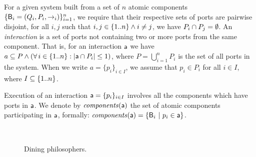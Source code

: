 \bd[Interaction] For a given system built from a set of $n$ atomic components 
$\{\mathsf{B}_i = (Q_i, P_i, \stackrel{}{\rightarrow}_i)\}_{i=1}^n$, we require that their respective sets of ports are
pairwise disjoint,
\ie for all $i, j$ such that $i, j \in \{ 1..n \} \land i \ne j$, we have $P_i \cap P_j = \emptyset$.
An {\em interaction} is a set of ports not containing two or more ports from the same component.
That is, for an interaction $\mathsf{a}$ we have 
$a \subseteq P \land (\forall\, i \in \{ 1..n \}: |\mathsf{a} \cap P_i| \le 1)$, where 
$P = \bigcup_{i=1}^n P_i$ is the set of all ports in the
system. When we write $a = \{p_i\}_{i \in I}$, we assume that
$p_i \in P_i$ for all $i \in I$, where $I \subseteq \{ 1..n \}$.
\ed

\noindent
Execution of an interaction
$\mathsf{a} = \{p_i\}_{i \in I}$
involves all the components which have
ports in $\mathsf{a}$.  
We denote by $\mathit{components}(\mathsf{a})$ the
set of atomic components participating in $\mathsf{a}$, formally:
$\mathit{components}(\mathsf{a}) = \{\mathsf{B}_i ~|~ p_i \in \mathsf{a}\}$. 


\begin{figure}[t]
  \begin{center}
    \mbox{
       \quad
      }
    \caption{Dining philosophers.}
    \label{fig:diningSpectrum}
  \end{center}
\end{figure}








